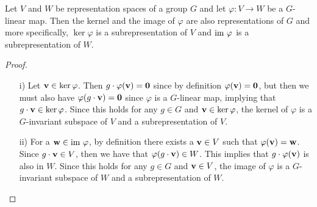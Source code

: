 \begin{proposition}\label{prop:kernelimagelinearmap}
	Let $V$ and $W$ be representation spaces of a group $G$ and let $\varphi: V \rightarrow W$ be a $G$-linear map. Then the kernel and the image of $\varphi$ are also representations of $G$ and more specifically, $\ker \varphi$ is a subrepresentation of $V$ and $\text{im } \varphi$ is a subrepresentation of $W$.
\end{proposition}
\begin{proof}
	\begin{itemize}
		\item[i)] Let $\mathbf{v} \in \ker \varphi$. Then $g \cdot \varphi (\mathbf{v}) = \mathbf{0}$ since by definition $\varphi(\mathbf{v}) = \mathbf{0}$, but then we must also have $\varphi ( g \cdot \mathbf{v} ) = \mathbf{0}$ since $\varphi$ is a $G$-linear map, implying that $g \cdot \mathbf{v} \in \ker \varphi$. Since this holds for any $g \in G$ and $\mathbf{v} \in \ker \varphi$, the kernel of $\varphi$ is a $G$-invariant subspace of $V$ and a subrepresentation of $V$. 
		\item[ii)] For a $\mathbf{w} \in \text{im } \varphi$, by definition there exists a $\mathbf{v} \in V$ such that $\varphi(\mathbf{v}) = \mathbf{w}$. Since $g \cdot \mathbf{v} \in V$, then we have that $\varphi ( g \cdot \mathbf{v}) \in W$. This implies that $g \cdot \varphi (\mathbf{v})$ is also in $W$. Since this holds for any $g \in G$ and $\mathbf{v} \in V$, the image of $\varphi$ is a $G$-invariant subspace of $W$ and a subrepresentation of $W$.	\qedhere
	\end{itemize}
\end{proof}

